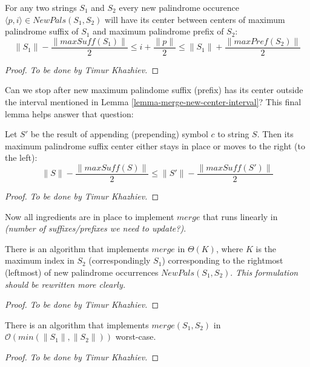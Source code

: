 \begin{lemma}
\label{lemma-merge-new-center-interval}
  For any two strings $S_1$ and $S_2$
  every new palindrome occurence
  $\langle p, i \rangle \in NewPals(S_1, S_2)$
  will have its center
  between centers of maximum palindrome suffix of $S_1$
  and maximum palindrome prefix of $S_2$:
  $$
  \|S_1\| - \frac{\|\mathit{maxSuff}(S_1)\|}{2} \le
  i + \frac{\|p\|}{2} \le
  \|S_1\| + \frac{\|\mathit{maxPref}(S_2)\|}{2}
  $$
\end{lemma}
\begin{proof}
  \emph{To be done by Timur Khazhiev.}
\end{proof}

Can we stop after new maximum palindome suffix (prefix)
has its center outside the interval mentioned in Lemma \ref{lemma-merge-new-center-interval}?
This final lemma helps answer that question:

\begin{lemma}
\label{lemma-center-move}
  Let $S'$ be the result of appending (prepending) symbol $c$ to string $S$.
  Then its maximum palindrome suffix center either stays in place
  or moves to the right (to the left):
  $$
  \|S\| - \frac{\|\mathit{maxSuff}(S)\|}{2} \le \|S'\| - \frac{\|\mathit{maxSuff}(S')\|}{2}
  $$
\end{lemma}
\begin{proof}
  \emph{To be done by Timur Khazhiev.}
\end{proof}

Now all ingredients are in place to implement $merge$
that runs linearly in \textit{(number of suffixes/prefixes we need to update?)}.

\begin{theorem}
  There is an algorithm that implements $merge$ in $\Theta(K)$,
  where $K$ is the maximum index in $S_2$ (correspondingly $S_1$)
  corresponding to the rightmost (leftmost)
  of new palindrome occurrences $NewPals(S_1, S_2)$.
  \emph{This formulation should be rewritten more clearly.}
\end{theorem}
\begin{proof}
  \emph{To be done by Timur Khazhiev.}
\end{proof}

\begin{corollary}
  There is an algorithm that implements $merge(S_1, S_2)$
  in $\mathcal{O}(min(\|S_1\|, \|S_2\|))$ worst-case.
\end{corollary}
\begin{proof}
  \emph{To be done by Timur Khazhiev.}
\end{proof}

